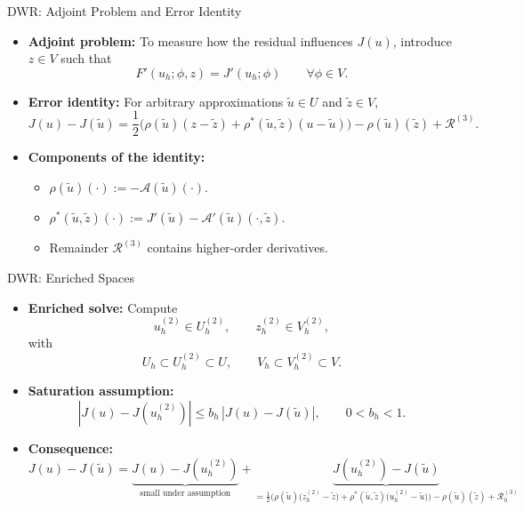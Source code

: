 \documentclass[aspectratio=169]{beamer}
\begin{document}
\begin{frame}{DWR: Adjoint Problem and Error Identity}
    \begin{itemize}
        \item \textbf{Adjoint problem:} To measure how the residual influences \(J(u)\), introduce \(z \in V\) such that
        $$F'(u_h; \phi, z) = J'(u_h; \phi) \qquad \forall \phi \in V.$$
        \vspace{0.1em}
        \item \textbf{Error identity:} For arbitrary approximations \(\tilde u \in U\) and \(\tilde z \in V\),
        $$J(u) - J(\tilde u)
        = \frac12\Big(\rho(\tilde u)(z-\tilde z)
        + \rho^*(\tilde u,\tilde z)(u-\tilde u)\Big)
        - \rho(\tilde u)(\tilde z) + \mathcal{R}^{(3)}.$$
        \vspace{0.1em}
        \item \textbf{Components of the identity:} 
        \begin{itemize}
            \vspace{0.5em}
            \item $\rho(\tilde{u})(\cdot) := -\mathcal{A}(\tilde{u})(\cdot)$.
            \vspace{0.5em}
            \item $\rho^*(\tilde{u},\tilde{z})(\cdot) := J'(\tilde{u}) - \mathcal{A}'(\tilde{u})(\cdot,\tilde{z})$.
            \vspace{0.5em}
            \item Remainder $\mathcal{R}^{(3)}$ contains higher-order derivatives.
        \end{itemize}
    \end{itemize}
\end{frame}


\begin{frame}{DWR: Enriched Spaces}
    \begin{itemize}
        \item \textbf{Enriched solve:} Compute
        \[
            u_h^{(2)} \in U_h^{(2)}, \qquad z_h^{(2)} \in V_h^{(2)},
        \]
        with
        \[
            U_h \subset U_h^{(2)} \subset U,
            \qquad
            V_h \subset V_h^{(2)} \subset V.
        \]

        \item \textbf{Saturation assumption:}
        \[
            |J(u) - J(u_h^{(2)})|
            \le b_h\, |J(u) - J(\tilde u)|,
            \qquad 0 < b_h < 1.
        \]

        \item \textbf{Consequence:}
        \[
        J(u)-J(\tilde u)
        = \underbrace{J(u)-J(u_h^{(2)})}_{\text{small under assumption}}
        + \underbrace{J(u_h^{(2)})-J(\tilde u)}_{=\frac12\Big(
        \rho(\tilde u)\big(z_h^{(2)}-\tilde z\big)
        +\rho^*(\tilde u,\tilde z)\big(u_h^{(2)}-\tilde u\big)
        \Big)
        -\rho(\tilde u)(\tilde z)+ \mathcal{R}_h^{(3)}}
        \]
    \end{itemize}
\end{frame}
\end{document}
